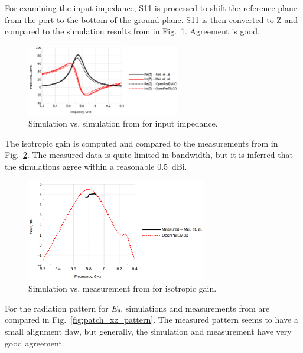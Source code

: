 \documentclass[titlepage]{article}
\renewcommand\_{\textunderscore\linebreak[1]}
\begin{document}
For examining the input impedance, S11 is processed to shift the reference plane from the port to the bottom of the ground plane.  S11 is then converted to Z and compared to the simulation results from \cite{Mei} in Fig.~\ref{fig:patch_impedance}. Agreement is good.

\begin{figure}[H]
  \centering
  \includegraphics[width=0.6\textwidth]{../regression/OpenParEM3D/antenna/patch_study/screenshots/patch_impedance}
  \caption{Simulation vs. simulation from \cite{Mei} for input impedance.}
  \label{fig:patch_impedance}
\end{figure}

The isotropic gain is computed and compared to the measurements from \cite{Mei} in Fig.~\ref{fig:patch_gain}.  The measured data is quite limited in bandwidth, but it is inferred that the simulations agree within a reasonable 0.5~dBi.

\begin{figure}[H]
  \centering
  \includegraphics[width=0.7\textwidth]{../regression/OpenParEM3D/antenna/patch_study/screenshots/patch_gain}
  \caption{Simulation vs. measurement from \cite{Mei} for isotropic gain.}
  \label{fig:patch_gain}
\end{figure}

For the radiation pattern for $E_{\theta}$, simulations and measurements from \cite{Mei} are compared in Fig.~\ref{fig:patch_xz_pattern}.  The measured pattern seems to have a small alignment flaw, but generally, the simulation and measurement have very good agreement.
\end{document}
